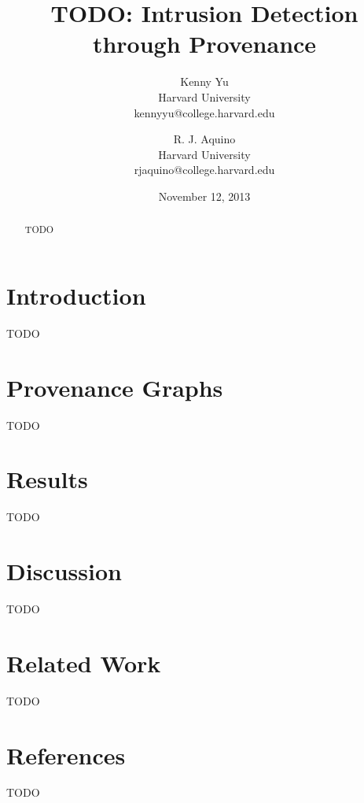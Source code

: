 \documentclass[10pt,twocolumn]{article}
\title{TODO: Intrusion Detection through Provenance}
\author{
    Kenny Yu\\
    Harvard University\\
    kennyyu@college.harvard.edu
  \and
    R. J. Aquino\\
    Harvard University\\
    rjaquino@college.harvard.edu
}
\date{November 12, 2013}
\begin{document}
\maketitle

\begin{abstract}
TODO
\end{abstract}

\section{Introduction}
TODO

\section{Provenance Graphs}
TODO

\section{Results}
TODO

\section{Discussion}
TODO

\section{Related Work}
TODO

\section{References}
TODO
\end{document}
